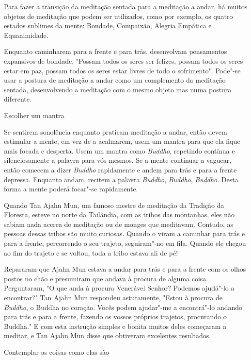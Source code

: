 Para fazer a transição da meditação sentada para a meditação a andar, há
muitos objetos de meditação que podem ser utilizados, como por exemplo,
os quatro estados sublimes da mente: Bondade, Compaixão, Alegria
Empática e Equanimidade.

Enquanto caminharem para a frente e para trás, desenvolvam pensamentos
expansivos de bondade, "Possam todos os seres ser felizes, possam todos
os seres estar em paz, possam todos os seres estar livres de todo o
sofrimento". Pode"-se usar a postura de meditação a andar como um
complemento da meditação sentada, desenvolvendo a meditação com o mesmo
objeto mas numa postura diferente.

\begin{siderule-quote}
  Escolher um mantra
\end{siderule-quote}

Se sentirem sonolência enquanto praticam meditação a andar, então devem
estimular a mente, em vez de a acalmarem, usem um mantra para que ela
fique mais focada e desperta. Usem um mantra como \emph{Buddho},
repetindo contínua e silenciosamente a palavra para vós mesmos. Se a
mente continuar a vaguear, então comecem a dizer \emph{Buddho}
rapidamente e andem para trás e para a frente depressa. Enquanto andam,
recitem a palavra \emph{Buddho}, \emph{Buddho}, \emph{Buddho}. Desta
forma a mente poderá focar"-se rapidamente.

Quando Tan Ajahn Mun, um famoso mestre de meditação da Tradição
da Floresta, esteve no norte da Tailândia, com as tribos das montanhas,
eles não sabiam nada acerca de meditação ou de monges que meditavam.
Contudo, as pessoas dessas tribos são muito curiosas. Quando o viram a
caminhar para trás e para a frente, percorrendo o seu trajeto,
seguiram"-no em fila. Quando ele chegou ao fim do trajeto e se voltou,
toda a tribo estava ali de pé!

Repararam que Ajahn Mun estava a andar para trás e para a frente
com os olhos postos no chão e presumiram que andava à procura de alguma
coisa. Perguntaram, "O que anda à procura Venerável Senhor? Podemos
ajudá"-lo a encontrar?" Tan Ajahn Mun respondeu astutamente,
"Estou à procura de \emph{Buddho}, o Buddha no coração. Vocês
podem ajudar"-me a encontrá"-lo andando para trás e para a frente, fazendo
os vossos próprios trajetos, procurando o Buddha." E com esta
instrução simples e bonita muitos deles começaram a meditar, e Tan
Ajahn Mun disse que obtiveram excelentes resultados.

\begin{siderule-quote}
  Contemplar as coisas como elas são
\end{siderule-quote}

